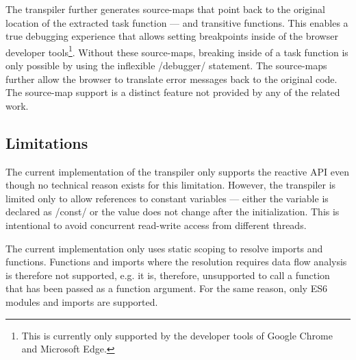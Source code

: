 The transpiler further generates source-maps that point back to the original location of the extracted task function --- and transitive functions. This enables a true debugging experience that allows setting breakpoints inside of the browser developer tools\footnote{This is currently only supported by the developer tools of Google Chrome and Microsoft Edge.}. Without these source-maps, breaking inside of a task function is only possible by using the inflexible \javascriptinline/debugger/ statement. The source-maps further allow the browser to translate error messages back to the original code. The source-map support is a distinct feature not provided by any of the related work.

\subsection{Limitations}
The current implementation of the transpiler only supports the reactive API even though no technical reason exists for this limitation. However, the transpiler is limited only to allow references to constant variables --- either the variable is declared as \javascriptinline/const/ or the value does not change after the initialization. This is intentional to avoid concurrent read-write access from different threads. 

The current implementation only uses static scoping to resolve imports and functions. Functions and imports where the resolution requires data flow analysis is therefore not supported, e.g. it is, therefore, unsupported to call a function that has been passed as a function argument. For the same reason, only ES6 modules and imports are supported.
